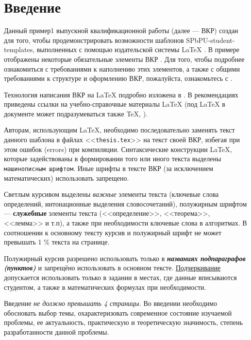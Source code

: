 \chapter*{Введение} %

Данный пример1 выпускной квалификационной работы (далее --- ВКР) создан для того, чтобы продемонстрировать возможности шаблонов SPbPU-student-templates, выполненных с помощью издательской системы \LaTeX{} \cite{spbpu-student-thesis-template}. В примере отображены некоторые обязательные элементы ВКР \cite{spbpu-student-thesis-specification}. Для того, чтобы подробнее ознакомиться с требованиями к наполнению этих элементов, а также с общими требованиями к структуре и оформлению ВКР, пожалуйста, ознакомьтесь с  \cite{spbpu-student-thesis-template-author-guide,spbpu-student-thesis-specification}. 


Технология написания ВКР на \LaTeX{} подробно изложена в \cite{spbpu-student-thesis-template-author-guide}. В рекомендациях приведены ссылки на учебно-справочные материалы \LaTeX{} (под \LaTeX{} в документе может подразумеваться также \TeX, \LaTeXe).


Авторам, использующим \LaTeX{}, необходимо последовательно заменять текст данного шаблона в файлах <<\verb|thesis.tex|>> на текст своей ВКР, избегая при этом ошибок (errors) при компиляции. Синтаксические конструкции \LaTeX, которые задействованы в формировании того или иного текста выделены \texttt{машинописным шрифтом}. Иные шрифты в тексте ВКР (за исключением математических) использовать запрещено. 

Светлым курсивом выделены \textit{важные} элементы текста (ключевые слова определений, интонационные выделения словосочетаний), полужирным шрифтом --- \textbf{служебные} элементы текста (<<определение>>, <<теорема>>, <<лемма>> и т.п), а также при необходимости ключевые слова в алгоритмах. В соотношении к основному тексту курсив и полужирный шрифт не может превышать 1 \% текста на странице.
 
Полужирный курсив разрешено использовать только в \textbf{\textit{названиях подпараграфов (пунктов)}} и запрещёно использовать в основном тексте. 
\uline{Подчеркивание} допускается использовать только в задании в местах, где данные вписываются студентом, а также в математических формулах при необходимости.

Введение \textit{не должно превышать 4 страницы}. Во введении необходимо обосновать выбор темы, охарактеризовать современное состояние изучаемой проблемы, ее актуальность, практическую и теоретическую значимость, степень разработанности данной проблемы.


